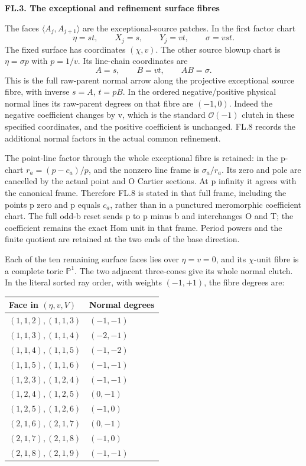 \par

\medskip\noindent\textbf{FL.3. The exceptional and refinement surface fibres}

\par\nobreak

The faces \(\langle A_j,A_{j+1}\rangle\) are the
exceptional-source patches. In the first factor chart
\[
 \eta=st,\qquad X_j=s,\qquad Y_j=vt,
 \qquad\sigma=vst.
\tag{FL.7}
\]
The fixed surface has coordinates \((\chi,v)\).
The other source blowup chart is \(\eta=\sigma p\)
with \(p=1/v\). Its line-chain coordinates are
\[
 A=s,\qquad B=vt,
 \qquad AB=\sigma.
\tag{FL.8}
\]
This is the full raw-parent normal arrow along the projective
exceptional source fibre, with inverse \(s=A\),
\(t=pB\). In the ordered negative/positive physical
normal lines its raw-parent degrees on that fibre are \((-1,0)\).
Indeed the negative coefficient changes by v, which
is the standard \(\mathcal O(-1)\) clutch in these
specified coordinates, and the positive coefficient
is unchanged. FL.8 records the additional normal factors
in the actual common refinement.

The point-line factor through the whole exceptional
fibre is retained: in the p-chart
\(r_a=(p-c_a)/p\), and the nonzero line frame is
\(\sigma_a/r_a\). Its zero and pole are cancelled
by the actual point and O Cartier sections. At p
infinity it agrees with the canonical frame. Therefore
FL.8 is stated in that full frame, including the
points p zero and p equals \(c_a\), rather than in
a punctured meromorphic coefficient chart. The full
odd-b reset sends p to p minus b and interchanges
O and T; the coefficient remains the exact Hom unit
in that frame. Period powers and the finite quotient
are retained at the two ends of the base direction.

Each of the ten remaining surface faces lies over
\(\eta=v=0\), and its \(\chi\)-unit fibre is a
complete toric \(\mathbb P^1\). The two adjacent
three-cones give its whole normal clutch. In the
literal sorted ray order, with weights \((-1,+1)\),
the fibre degrees are:

\begin{longtable}[]{@{}ll@{}}
\toprule\noalign{}
Face in \((\eta,v,V)\) & Normal degrees \\
\midrule\noalign{}
\endhead
\bottomrule\noalign{}
\endlastfoot
\((1,1,2),(1,1,3)\) & \((-1,-1)\) \\
\((1,1,3),(1,1,4)\) & \((-2,-1)\) \\
\((1,1,4),(1,1,5)\) & \((-1,-2)\) \\
\((1,1,5),(1,1,6)\) & \((-1,-1)\) \\
\((1,2,3),(1,2,4)\) & \((-1,-1)\) \\
\((1,2,4),(1,2,5)\) & \((0,-1)\) \\
\((1,2,5),(1,2,6)\) & \((-1,0)\) \\
\((2,1,6),(2,1,7)\) & \((0,-1)\) \\
\((2,1,7),(2,1,8)\) & \((-1,0)\) \\
\((2,1,8),(2,1,9)\) & \((-1,-1)\) \\
\end{longtable}

